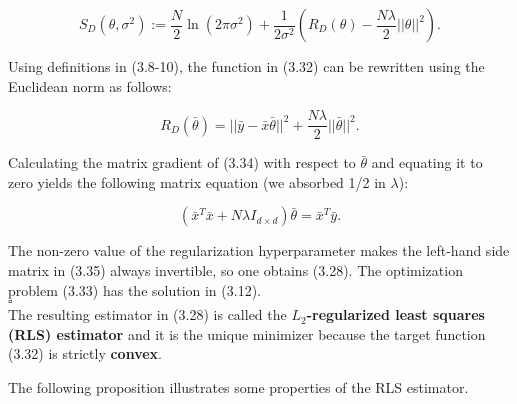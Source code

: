 \documentclass{report}
\begin{document}
\begin{equation}
S_{D}(\theta,\sigma^2) := \frac{N}{2}\ln(2\pi\sigma^2)+\frac{1}{2\sigma^2}\left(R_{D}(\theta)-\frac{N\lambda}{2}||\theta||^2\right).
\end{equation}

Using definitions in (3.8-10), the function in (3.32) can be rewritten using the Euclidean norm as follows:

\begin{equation}
R_{D}(\bar{\theta}) = ||\bar{y} -\bar{x}\bar{\theta}||^2 +\frac{N\lambda}{2}||\bar{\theta}||^2.
\end{equation}

Calculating the matrix gradient of (3.34) with respect to $\bar{\theta}$ and equating it to zero yields the following matrix equation (we absorbed 1/2 in $\lambda$):

\begin{equation}
(\bar{x}^T\bar{x}+ N\lambda I_{d\times d})\bar{\theta} = \bar{x}^T\bar{y}.
\end{equation}

The non-zero value of the regularization hyperparameter makes the left-hand side matrix in (3.35) always invertible, so one obtains (3.28). The optimization problem (3.33) has the solution in (3.12).\\
$\square$\\

The resulting estimator in (3.28) is called the \textbf{$L_2$-regularized least squares (RLS) estimator} and it is the unique minimizer because the target function (3.32) is strictly \textbf{convex}.

The following proposition illustrates some properties of the RLS estimator.
\end{document}
